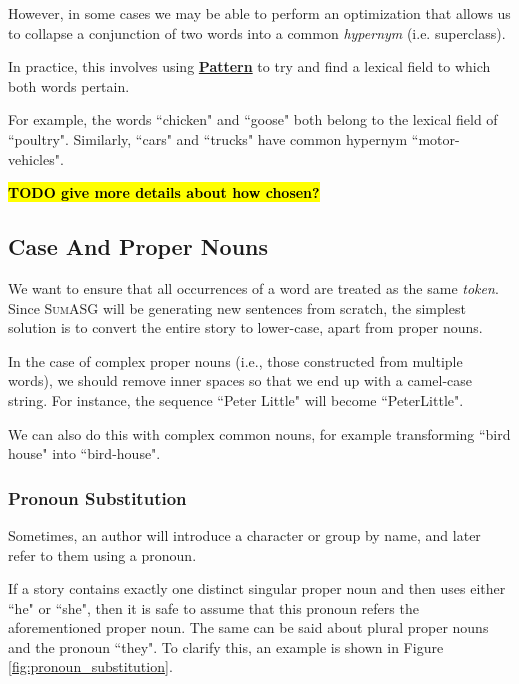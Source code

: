 However, in some cases we may be able to perform an optimization that allows us to collapse a conjunction of two words into a common \textit{hypernym} (i.e. superclass).

In practice, this involves using \textbf{\href{http://web.archive.org/web/20190516161631/https://www.clips.uantwerpen.be/pages/pattern-en}{Pattern}} to try and find a lexical field to which both words pertain.

For example, the words ``chicken" and ``goose" both belong to the lexical field of ``poultry". Similarly, ``cars" and ``trucks" have common hypernym ``motor-vehicles".

\textcolor{red}{\textbf{\hl{TODO give more details about how chosen?}}}

\subsection{Case And Proper Nouns}

We want to ensure that all occurrences of a word are treated as the same \textit{token}. Since \textsc{SumASG} will be generating new sentences from scratch, the simplest solution is to convert the entire story to lower-case, apart from proper nouns.

In the case of complex proper nouns (i.e., those constructed from multiple words), we should remove inner spaces so that we end up with a camel-case string. For instance, the sequence ``Peter Little" will become ``PeterLittle".

We can also do this with complex common nouns, for example transforming ``bird house" into ``bird-house".

\subsubsection{Pronoun Substitution}

Sometimes, an author will introduce a character or group by name, and later refer to them using a pronoun.

If a story contains exactly one distinct singular proper noun and then uses either ``he" or ``she", then it is safe to assume that this pronoun refers the aforementioned proper noun. The same can be said about plural proper nouns and the pronoun ``they".
To clarify this, an example is shown in Figure \ref{fig:pronoun_substitution}.

